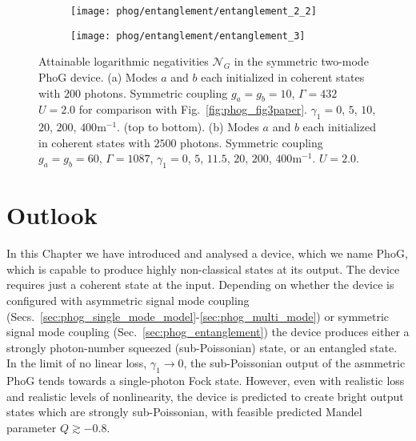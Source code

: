 
\begin{figure}[htp]
\captionsetup{width=\linewidth}
\centering
	\begin{subfigure}{0.7\linewidth}
	\centering
	\caption{}
	\texttt{[image: phog/entanglement/entanglement\_2\_2]}
	\end{subfigure}
	\begin{subfigure}{0.7\linewidth}
	\centering
	\caption{}
	\texttt{[image: phog/entanglement/entanglement\_3]}
	\end{subfigure}
	\caption{\label{fig:phog_negativities} Attainable logarithmic negativities $\mathcal{N}_G$ in the symmetric two-mode PhoG device. (a) Modes $a$ and $b$ each initialized in coherent states with $200$ photons. Symmetric coupling $g_a = g_b = 10$, $\Gamma=432$ $U=2.0$ for comparison with Fig.~\ref{fig:phog_fig3paper}. $\gamma_1 = 0$, $5$, $10$, $20$, $200$, $400$m$^{-1}$. (top to bottom). (b) Modes $a$ and $b$ each initialized in coherent states with $2500$ photons. Symmetric coupling $g_a = g_b = 60$, $\Gamma = 1087$, $\gamma_1 = 0$, $5$, $11.5$, $20$, $200$, $400$m$^{-1}$. $U = 2.0$.}
\end{figure}

\FloatBarrier
\section{Outlook}\label{sec:phog_outlook}
In this Chapter we have introduced and analysed a device, which we name PhoG, which is capable to produce highly non-classical states at its output. The device requires just a coherent state at the input. Depending on whether the device is configured with asymmetric signal mode coupling (Secs.~\ref{sec:phog_single_mode_model}-\ref{sec:phog_multi_mode}) or symmetric signal mode coupling (Sec.~\ref{sec:phog_entanglement}) the device produces either a strongly photon-number squeezed (sub-Poissonian) state, or an entangled state. In the limit of no linear loss, $\gamma_1 \rightarrow 0$, the sub-Poissonian output of the asmmetric PhoG tends towards a single-photon Fock state. However, even with realistic loss and realistic levels of nonlinearity, the device is predicted to create bright output states which are strongly sub-Poissonian, with feasible predicted Mandel parameter $Q \gtrsim -0.8$.

